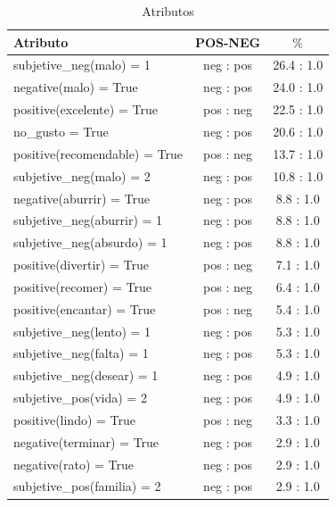 \documentclass[12pt]{article}
\begin{document}
\begin{table}[!htb]
\begin{center}
\begin{tabular}{|l|c|c|} 
\hline
 \multicolumn{1}{|l}{Atributo}&
 \multicolumn{1}{|c}{POS-NEG}&
 \multicolumn{1}{|c|}{$\%$}
\tabularnewline
  \hline
subjetive\_neg(malo) = 1           &      neg : pos    &     26.4 : 1.0 \\ \hline
          negative(malo) = True    &          neg : pos    &     24.0 : 1.0 \\ \hline
     positive(excelente) = True    &          pos : neg    &     22.5 : 1.0 \\ \hline
                no\_gusto = True    &          neg : pos    &     20.6 : 1.0 \\ \hline
  positive(recomendable) = True    &          pos : neg    &     13.7 : 1.0 \\ \hline
     subjetive\_neg(malo) = 2       &          neg : pos    &     10.8 : 1.0 \\ \hline
       negative(aburrir) = True    &          neg : pos    &      8.8 : 1.0 \\ \hline
  subjetive\_neg(aburrir) = 1       &          neg : pos    &      8.8 : 1.0 \\ \hline
  subjetive\_neg(absurdo) = 1       &          neg : pos    &      8.8 : 1.0 \\ \hline
      positive(divertir) = True    &          pos : neg    &      7.1 : 1.0 \\ \hline
       positive(recomer) = True    &          pos : neg    &      6.4 : 1.0 \\ \hline
      positive(encantar) = True    &          pos : neg    &      5.4 : 1.0 \\ \hline
    subjetive\_neg(lento) = 1       &          neg : pos    &      5.3 : 1.0 \\ \hline
    subjetive\_neg(falta) = 1       &          neg : pos    &      5.3 : 1.0 \\ \hline
   subjetive\_neg(desear) = 1       &          neg : pos    &      4.9 : 1.0 \\ \hline
     subjetive\_pos(vida) = 2       &          neg : pos    &      4.9 : 1.0 \\ \hline
         positive(lindo) = True    &          pos : neg    &      3.3 : 1.0 \\ \hline
      negative(terminar) = True    &          neg : pos    &      2.9 : 1.0 \\ \hline
          negative(rato) = True    &          neg : pos    &      2.9 : 1.0 \\ \hline
  subjetive\_pos(familia) = 2       &          neg : pos    &      2.9 : 1.0 \\ \hline


\end{tabular} 
\end{center}
\caption{Atributos} 
\label{tabla:atributos}
\end{table}
\end{document}

